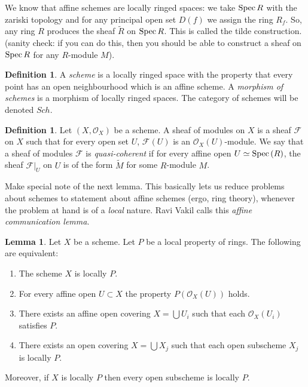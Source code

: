 \documentclass[11pt]{amsart}
\newcommand{\Spec}{{\rm Spec \,}}
\renewcommand{\tilde}{\widetilde}
\theoremstyle{definition}
\newtheorem{lemma}[theorem]{Lemma}
\newtheorem{definition}[theorem]{Definition}
\begin{document}
We know that affine schemes are locally ringed spaces: we take $\Spec R$ with the zariski topology and for any principal open set $D(f)$ we assign the ring $R_f$. So, any ring $R$ produces the sheaf $\tilde{R}$ on $\Spec R$. This is called the tilde construction. (sanity check: if you can do this, then you should be able to construct a sheaf on $\Spec R$ for any $R$-module $M$).


\begin{definition}
	A {\it scheme} is a locally ringed space with the property that
	every point has an open neighbourhood which is an affine scheme.
	A {\it morphism of schemes} is a morphism of locally
	ringed spaces. The category of schemes will be denoted
	$Sch$.
\end{definition}

\begin{definition}
	Let $(X,\mathcal{O}_X)$ be a scheme. A sheaf of modules on $X$ is a sheaf $\mathcal{F}$ on $X$ such that for every open set $U$, $\mathcal{F}(U)$ is an $\mathcal{O}_X(U)$-module. We say that a sheaf of modules $\mathcal{F}$ is \textit{quasi-coherent} if for every affine open $U\simeq \Spec(R)$, the sheaf $\mathcal{F}|_U$ on $U$ is of the form $\tilde{M}$ for some $R$-module $M$.
\end{definition}


Make special note of the next lemma. This basically lets us reduce problems about schemes to statement about affine schemes (ergo, ring theory), whenever the problem at hand is of a \textit{local} nature. Ravi Vakil calls this \textit{affine communication lemma}.


\begin{lemma}
	\label{lemma-locally-P}
	Let $X$ be a scheme. Let $P$ be a local property of rings.
	The following are equivalent:
	\begin{enumerate}
		\item The scheme $X$ is locally $P$.
		\item For every affine open $U \subset X$ the property
		$P(\mathcal{O}_X(U))$ holds.
		\item There exists an affine open covering $X = \bigcup U_i$ such that
		each $\mathcal{O}_X(U_i)$ satisfies $P$.
		\item There exists an open covering $X = \bigcup X_j$
		such that each open subscheme $X_j$ is locally $P$.
	\end{enumerate}
	Moreover, if $X$ is locally $P$ then every open subscheme
	is locally $P$.
\end{lemma}
\end{document}
